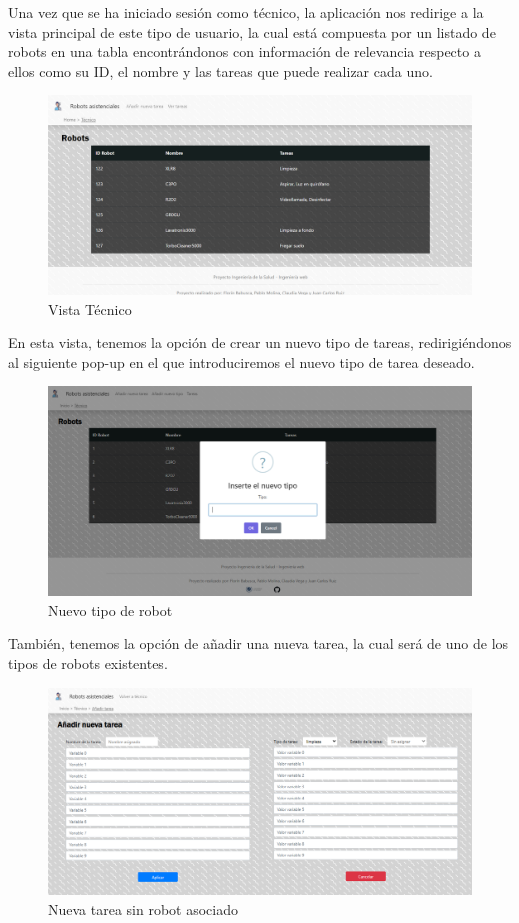 Una vez que se ha iniciado sesión como técnico, la aplicación nos redirige a la vista principal de este tipo de usuario, la cual está compuesta por un listado de robots en una tabla encontrándonos con información de relevancia respecto a ellos como su ID, el nombre y las tareas que puede realizar cada uno. 
\begin{figure}[H]
	\centering
	\includegraphics[width=1\textwidth]{images/VistaTecnico.png}
	\caption{Vista Técnico}
	\label{fig:UMLModel}
\end{figure}
En esta vista, tenemos la opción de crear un nuevo tipo de tareas, redirigiéndonos al siguiente pop-up en el que introduciremos el nuevo tipo de tarea deseado. 
\begin{figure}[H]
	\centering
	\includegraphics[width=1\textwidth]{images/NewRobotType.png}
	\caption{Nuevo tipo de robot}
	\label{fig:UMLModel}
\end{figure}

También, tenemos la opción de añadir una nueva tarea, la cual será de uno de los tipos de robots existentes.

\begin{figure}[H]
	\centering
	\includegraphics[width=1\textwidth]{images/Tech-TaskCreatorNoRobot.png}
	\caption{Nueva tarea sin robot asociado}
	\label{fig:UMLModel}
\end{figure}

